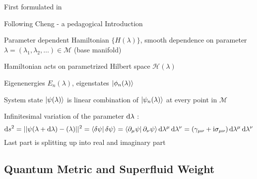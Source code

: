 \documentclass[../notes.tex]{subfiles}
\begin{document}
First formulated in \cite{provostRiemannianStructureManifolds1980}

Following Cheng - a pedagogical Introduction 

Parameter dependent Hamiltonian \(\{H(\lambda)\}\), smooth dependence on parameter \(\lambda = (\lambda_1, \lambda_2, \ldots) \in \mathcal{M}\) (base manifold)

Hamiltonian acts on parametrized Hilbert space \(\mathcal{H} (\lambda)\)

Eigenenergies \(E_n (\lambda)\), eigenstates \(\ket{\phi_n (\lambda)}\)

System state \(\ket{\psi (\lambda)}\) is linear combination of \(\ket{\psi_n (\lambda)}\) at every point in \(\mathcal{M}\)

Infinitesimal variation of the parameter \(\odif{\lambda}\) :
\begin{equation}
	\odif{s^2} = \vert\vert \psi (\lambda + \odif{\lambda}) - \si (\lambda) \vert \vert^2 = \braket{\fdif{\psi} | \fdif{\psi}} = \braket{\pdif{\mu} \psi | \pdif{\nu} \psi} \odif{\lambda^{\mu}} \odif{\lambda^{\nu}} = (\gamma_{\mu \nu} + \iu \sigma_{\mu \nu}) \odif{\lambda^{\mu}} \odif{\lambda^{\nu}}
\end{equation}
Last part is splitting up into real and imaginary part

\subsection*{Quantum Metric and Superfluid Weight}


\cite{peottaSuperfluidityTopologicallyNontrivial2015}
\end{document}

